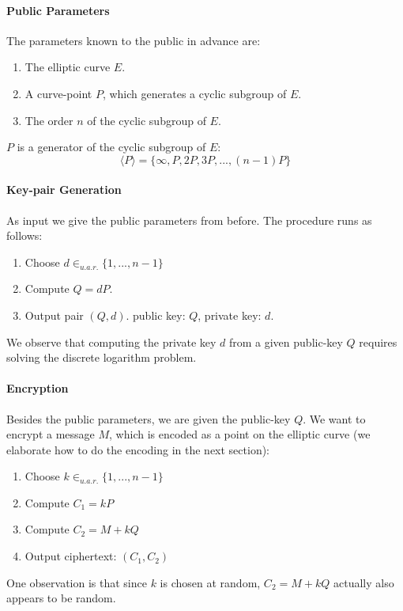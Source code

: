 \documentclass[11pt,english]{article}
\begin{document}
\paragraph{Public Parameters} The parameters known to the public in advance are:
\begin{enumerate}
 \item The elliptic curve $E$.
 \item A curve-point $P$, which generates a cyclic subgroup of $E$.
 \item The order $n$ of the cyclic subgroup of $E$.
\end{enumerate}
$P$ is a generator of the cyclic subgroup of $E$:
\begin{displaymath}
 \langle P\rangle=\{\infty,P,2P,3P,...,(n-1)P\}
\end{displaymath}


\paragraph{Key-pair Generation}
As input we give the public parameters from before. The procedure runs as follows:
\begin{enumerate}
 \item Choose $d\in_{u.a.r.}\{1,...,n-1\}$
 \item Compute $Q=dP$.
 \item Output pair $(Q,d)$. public key: $Q$, private key: $d$.
\end{enumerate}
We observe that computing the private key $d$ from a given public-key $Q$ requires solving the discrete logarithm problem.

\paragraph{Encryption}
Besides the public parameters, we are given the public-key $Q$. We want to encrypt a message $M$, which is encoded as a point on the elliptic curve (we elaborate how to do the encoding in the next section):
\begin{enumerate}
\item Choose $k\in_{u.a.r.}\{1,...,n-1\}$
\item Compute $C_1=kP$
\item Compute $C_2=M+kQ$
\item Output ciphertext: $(C_1,C_2)$
\end{enumerate}
One observation is that since $k$ is chosen at random, $C_2=M+kQ$ actually also appears to be random.
\end{document}
